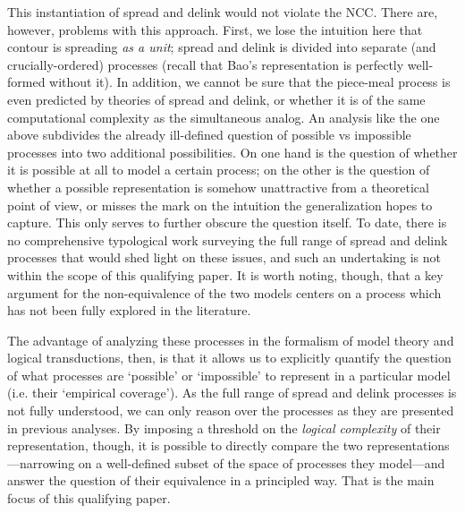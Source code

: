\documentclass{article}
\begin{document}
This instantiation of spread and delink would not violate the NCC. There are, however, problems with this approach. First, we lose the intuition here that contour is spreading \emph{as a unit}; spread and delink is divided into separate (and crucially-ordered) processes (recall that Bao's representation is perfectly well-formed without it). In addition, we cannot be sure that the piece-meal process is even predicted by theories of spread and delink, or whether it is of the same computational complexity as the simultaneous analog. An analysis like the one above subdivides the already ill-defined question of possible vs impossible processes into two additional possibilities. On one hand is the question of whether it is possible at all to model a certain process; on the other is the question of whether a possible representation is somehow unattractive from a theoretical point of view, or misses the mark on the intuition the generalization hopes to capture. This only serves to further obscure the question itself. To date, there is no comprehensive typological work surveying the full range of spread and delink processes that would shed light on these issues, and such an undertaking is not within the scope of this qualifying paper. It is worth noting, though, that a key argument for the non-equivalence of the two models centers on a process which has not been fully explored in the literature. \par
The advantage of analyzing these processes in the formalism of model theory and logical transductions, then, is that it allows us to explicitly quantify the question of what processes are `possible' or `impossible' to represent in a particular model (i.e. their `empirical coverage'). As the full range of spread and delink processes is not fully understood, we can only reason over the processes as they are presented in previous analyses. By imposing a threshold on the \emph{logical complexity} of their representation, though, it is possible to directly compare the two representations---narrowing on a well-defined subset of the space of processes they model---and answer the question of their equivalence in a principled way. That is the main focus of this qualifying paper. 
\end{document}
